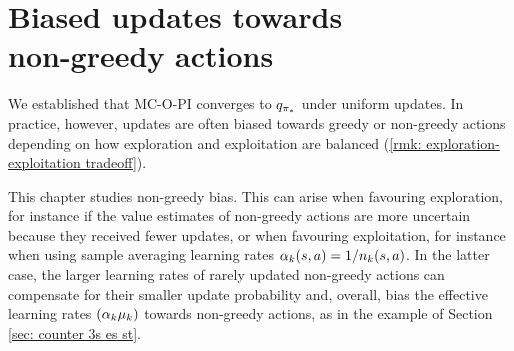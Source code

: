 \chapter[Biased updates towards non-greedy actions]{Biased updates towards \\ non-greedy actions}
\label{ch: non-greedy bias}




We established that MC-O-PI converges to $q_{{\pi}_*}$ under uniform updates. 
In practice, however, updates are often biased towards greedy or non-greedy actions depending on how exploration and exploitation are balanced (\autoref{rmk: exploration-exploitation tradeoff}).


This chapter studies non-greedy bias.
This can arise when favouring exploration, for instance if the value estimates of non-greedy actions are more uncertain because they received fewer updates,
or when favouring exploitation,
for instance when using sample averaging learning rates $\alpha_k(s,a) = 1 / n_k(s,a)$. In the latter case, the larger learning rates of rarely updated non-greedy actions can compensate for their smaller update probability and, overall, bias the effective learning rates $(\alpha_k \mu_k)$ towards non-greedy actions,
as in the example of Section \ref{sec: counter 3s es st}.










